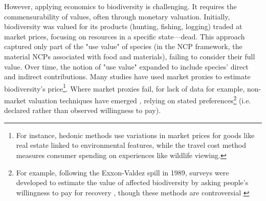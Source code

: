 However, applying economics to biodiversity is challenging. It requires the commensurability of values, often through monetary valuation. Initially, biodiversity was valued for its products (hunting, fishing, logging) traded at market prices, focusing on resources in a specific state—dead. This approach captured only part of the "use value" of species \citep{Krutilla1967} (in the NCP framework, the material NCPs associated with food and materials), failing to consider their full value. Over time, the notion of "use value" expanded to include species' direct and indirect contributions. Many studies have used market proxies to estimate biodiversity's price\footnote{For instance, hedonic methods \citep{rosen_hedonic_1974} use variations in market prices for goods like real estate linked to environmental features, while the travel cost method \citep{clawson_economics_1967, bhandari_willingness_2010} measures consumer spending on experiences like wildlife viewing.}. Where market proxies fail, for lack of data for example, non-market valuation techniques have emerged \citep{carson_contingent_2012}, relying on stated preferences\footnote{For example, following the Exxon-Valdez spill in 1989, surveys were developed to estimate the value of affected biodiversity by asking people's willingness to pay for recovery \citep{carson_contingent_1992, arrow_report_1993, carson_contingent_2003}, though these methods are controversial \citep{Diamond94}} (i.e. declared rather than observed willingness to pay). 
